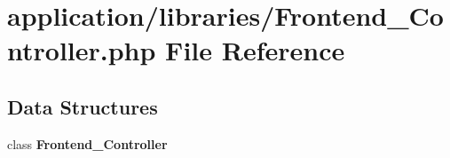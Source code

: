 \section{application/libraries/\-Frontend\-\_\-\-Controller.php File Reference}
\label{_frontend___controller_8php}
\subsection*{Data Structures}
\begin{DoxyCompactItemize}
\item 
class {\bf Frontend\-\_\-\-Controller}
\end{DoxyCompactItemize}
